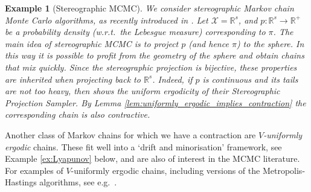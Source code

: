 \documentclass[12pt]{article}
\theoremstyle{plain}
\newtheorem{example}[thm]{Example}
\newcommand{\R}{\mathbb{R}}
\newcommand{\cX}{\mathcal{X}}
\begin{document}
\begin{example}[Stereographic MCMC]
We consider stereographic Markov chain Monte Carlo algorithms, as recently introduced in \cite{yang2024stereographic}.
Let $\cX = \R^s$, and $p \colon \R^s \to \R^+$ be a probability density (w.r.t.~the Lebesgue measure) corresponding to $\pi$.
The main idea of stereographic MCMC is to project $p$ (and hence $\pi$) to the sphere.
In this way it is possible to profit from the geometry of the sphere and obtain chains that mix quickly. 
Since the stereographic projection is bijective, these properties are inherited when projecting back to $\R^s$. 
Indeed, if $p$ is continuous and its tails are not too heavy, then \cite[Theorem 2.1]{yang2024stereographic} shows the uniform ergodicity of their \textit{Stereographic Projection Sampler}. 
By Lemma \ref{lem:uniformly_ergodic_implies_contraction} the corresponding chain is also contractive. 
\end{example}

Another class of Markov chains for which we have a contraction are \textit{$V$-uniformly ergodic} chains. 
These fit well into a `drift and minorisation' framework, see Example \ref{ex:Lyapunov} below, and are also of interest in the MCMC literature. 
For examples of $V$-uniformly ergodic chains, including versions of the Metropolis-Hastings algorithms, see e.g.~\cite[Section 3.4]{roberts2004general}.
\end{document}
